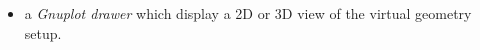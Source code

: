 \begin{itemize}
\begin{itemize}
  \end{itemize}
 

\item a \emph{Gnuplot drawer} which display a 2D or 3D view of the virtual
  geometry setup.

\end{itemize}
\clearpage


